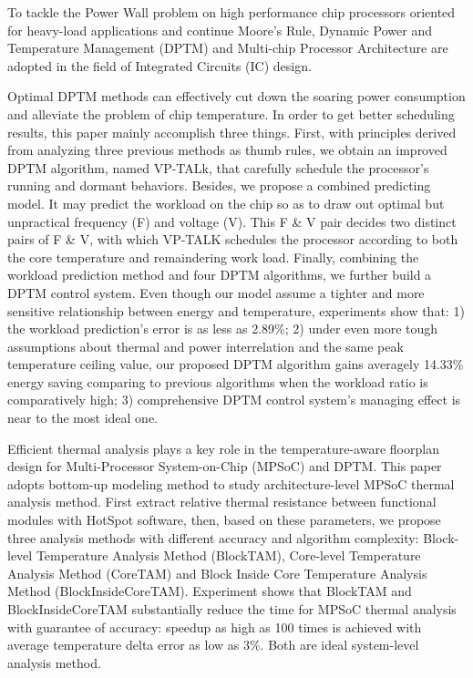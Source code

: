 
\begin{eabstract}

To tackle the Power Wall problem on high performance chip processors oriented for heavy-load applications and continue Moore's Rule, Dynamic Power and Temperature Management (DPTM) and Multi-chip Processor Architecture are adopted in the field of Integrated Circuits (IC) design.

Optimal DPTM methods can effectively cut down the soaring power consumption and alleviate the problem of chip temperature. In order to get better scheduling results, this paper mainly accomplish three things. First, with principles derived from analyzing three previous methods as thumb rules, we obtain an improved DPTM algorithm, named VP-TALk, that carefully schedule the processor's running and dormant behaviors. Besides, we propose a combined predicting model. It may predict the workload on the chip so as to draw out optimal but unpractical frequency (F) and voltage (V). This F \& V pair decides two distinct pairs of F \& V, with which VP-TALK schedules the processor according to both the core temperature and remaindering work load. Finally, combining the workload prediction method and four DPTM algorithms, we further build a DPTM control system. Even though our model assume a tighter and more sensitive relationship between energy and temperature, experiments show that: 1) the workload prediction's error is as less as 2.89\%; 2) under even more tough assumptions about thermal and power interrelation and the same peak temperature ceiling value, our proposed DPTM algorithm gains averagely 14.33\% energy saving comparing to previous algorithms when the workload ratio is comparatively high; 3) comprehensive DPTM control system's managing effect is near to the most ideal one.

Efficient thermal analysis plays a key role in the temperature-aware floorplan design for Multi-Processor System-on-Chip (MPSoC) and DPTM. This paper adopts bottom-up modeling method to study architecture-level MPSoC thermal analysis method. First extract relative thermal resistance between functional modules with HotSpot software, then, based on these parameters, we propose three analysis methods with different accuracy and algorithm complexity: Block-level Temperature Analysis Method (BlockTAM), Core-level Temperature Analysis Method (CoreTAM) and Block Inside Core Temperature Analysis Method (BlockInsideCoreTAM). Experiment shows that BlockTAM and BlockInsideCoreTAM substantially reduce the time for MPSoC thermal analysis with guarantee of accuracy: speedup as high as 100 times is achieved with average temperature delta error as low as 3\%. Both are ideal system-level analysis method.

\end{eabstract}


